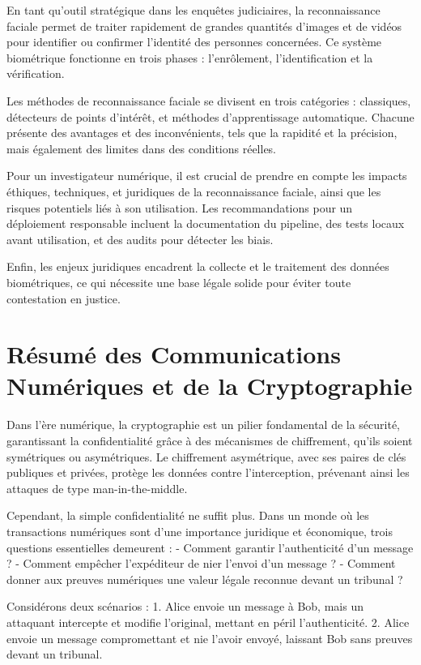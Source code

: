 \documentclass[12pt,a4paper]{article}
\begin{document}
En tant qu'outil stratégique dans les enquêtes judiciaires, la reconnaissance faciale permet de traiter rapidement de grandes quantités d'images et de vidéos pour identifier ou confirmer l'identité des personnes concernées. Ce système biométrique fonctionne en trois phases : l'enrôlement, l'identification et la vérification.

Les méthodes de reconnaissance faciale se divisent en trois catégories : classiques, détecteurs de points d'intérêt, et méthodes d'apprentissage automatique. Chacune présente des avantages et des inconvénients, tels que la rapidité et la précision, mais également des limites dans des conditions réelles.

Pour un investigateur numérique, il est crucial de prendre en compte les impacts éthiques, techniques, et juridiques de la reconnaissance faciale, ainsi que les risques potentiels liés à son utilisation. Les recommandations pour un déploiement responsable incluent la documentation du pipeline, des tests locaux avant utilisation, et des audits pour détecter les biais.

Enfin, les enjeux juridiques encadrent la collecte et le traitement des données biométriques, ce qui nécessite une base légale solide pour éviter toute contestation en justice.

\section{Résumé des Communications Numériques et de la Cryptographie}

Dans l'ère numérique, la cryptographie est un pilier fondamental de la sécurité, garantissant la confidentialité grâce à des mécanismes de chiffrement, qu'ils soient symétriques ou asymétriques. Le chiffrement asymétrique, avec ses paires de clés publiques et privées, protège les données contre l'interception, prévenant ainsi les attaques de type man-in-the-middle.

Cependant, la simple confidentialité ne suffit plus. Dans un monde où les transactions numériques sont d'une importance juridique et économique, trois questions essentielles demeurent : 
- Comment garantir l’authenticité d’un message ?
- Comment empêcher l’expéditeur de nier l’envoi d’un message ?
- Comment donner aux preuves numériques une valeur légale reconnue devant un tribunal ?

Considérons deux scénarios :
1. Alice envoie un message à Bob, mais un attaquant intercepte et modifie l’original, mettant en péril l’authenticité.
2. Alice envoie un message compromettant et nie l’avoir envoyé, laissant Bob sans preuves devant un tribunal.
\end{document}
